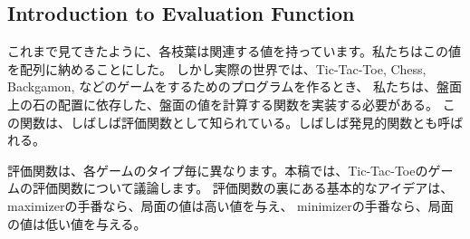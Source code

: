 \documentclass[uplatex,a4paper,11pt,oneside,openany]{jsbook}
\begin{document}

\subsection{Introduction to Evaluation Function}

これまで見てきたように、各枝葉は関連する値を持っています。私たちはこの値を配列に納めることにした。
しかし実際の世界では、Tic-Tac-Toe, Chess, Backgamon, などのゲームをするためのプログラムを作るとき、
私たちは、盤面上の石の配置に依存した、盤面の値を計算する関数を実装する必要がある。
この関数は、しばしば評価関数として知られている。しばしば発見的関数とも呼ばれる。

評価関数は、各ゲームのタイプ毎に異なります。本稿では、Tic-Tac-Toeのゲームの評価関数について議論します。
評価関数の裏にある基本的なアイデアは、
maximizerの手番なら、局面の値は高い値を与え、
minimizerの手番なら、局面の値は低い値を与える。
\end{document}
